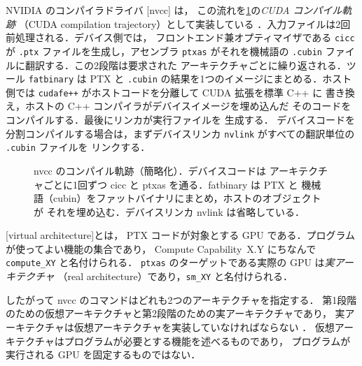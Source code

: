 \documentclass[../main.tex]{subfiles}
\begin{document}
NVIDIA のコンパイラドライバ [nvcc] は，
この流れを\cref{fig:l10-cuda-flow}の\emph{CUDA コンパイル軌跡}
（CUDA compilation trajectory）として実装している
\cite[§3]{nvidia2026nvcc}．入力ファイルは2回前処理される．デバイス側では，
フロントエンド兼オプティマイザである \texttt{cicc} が \texttt{.ptx}
ファイルを生成し，アセンブラ \texttt{ptxas} がそれを機械語の
\texttt{.cubin} ファイルに翻訳する．この2段階は要求された
アーキテクチャごとに繰り返される．ツール \texttt{fatbinary} は PTX と
\texttt{.cubin} の結果を1つのイメージにまとめる．ホスト側では
\texttt{cudafe++} がホストコードを分離して CUDA 拡張を標準 C++ に
書き換え，ホストの C++ コンパイラがデバイスイメージを埋め込んだ
そのコードをコンパイルする．最後にリンカが実行ファイルを
生成する．
デバイスコードを分割コンパイルする場合は，まずデバイスリンカ
\texttt{nvlink} がすべての翻訳単位の \texttt{.cubin} ファイルを
リンクする．

\begin{figure}[tb]
  \centering
  
  \caption{nvcc のコンパイル軌跡（簡略化）．デバイスコードは
    アーキテクチャごとに1回ずつ cicc と ptxas を通る．fatbinary は PTX と
    機械語（cubin）をファットバイナリにまとめ，ホストのオブジェクトが
    それを埋め込む．デバイスリンカ nvlink は省略している．}
  \label{fig:l10-cuda-flow}
\end{figure}

\begin{definition}[仮想アーキテクチャ]
  [virtual architecture]とは，
  PTX コードが対象とする GPU である．プログラムが使ってよい機能の集合であり，
  Compute Capability~X.Y にちなんで \texttt{compute\_XY} と名付けられる．
  \texttt{ptxas} のターゲットである実際の GPU は\emph{実アーキテクチャ}
  （real architecture）であり，\texttt{sm\_XY} と名付けられる．
\end{definition}

したがって nvcc のコマンドはどれも2つのアーキテクチャを指定する．
第1段階のための仮想アーキテクチャと第2段階のための実アーキテクチャであり，
実アーキテクチャは仮想アーキテクチャを実装していなければならない
\cite[§5.4]{nvidia2026nvcc}．
仮想アーキテクチャはプログラムが必要とする機能を述べるものであり，
プログラムが実行される GPU を固定するものではない．
\end{document}
